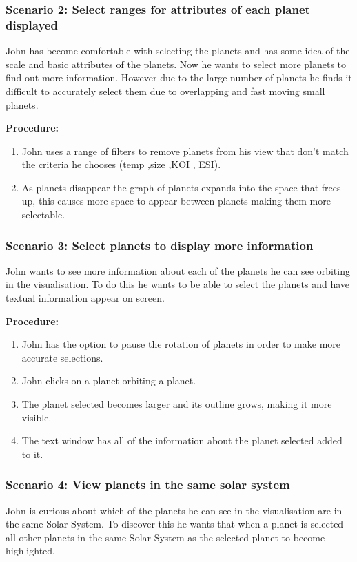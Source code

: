   \subsubsection{Scenario 2: Select ranges for attributes of each planet displayed}
 John has become comfortable with selecting the planets and has some idea of the
scale and basic attributes of the planets. Now he wants to select more planets
to find out more information. However due to the large number of planets he
finds it difficult to accurately select them due to overlapping and fast moving
small planets.
 
  {\bf Procedure:}
  \begin{enumerate}
 \item John uses a range of filters to remove planets from his view that don't
match the criteria he chooses (temp ,size ,KOI , ESI).
\item As planets disappear the graph of planets expands into the space that
frees up, this causes more space to appear between planets making them more
selectable.
 \end{enumerate}
 
  \subsubsection{Scenario 3: Select planets to display more information}
 John wants to see more information about each of the planets he can see
orbiting in the visualisation. To do this he wants to be able to select the
planets and have textual information appear on screen.
 
  {\bf  Procedure:}
   \begin{enumerate}
 \item John has the option to pause the rotation of planets in order to make
more accurate selections. 
 \item John clicks on a planet orbiting a planet.
\item The planet selected becomes larger and its outline grows, making it more
visible.
\item The text window has all of the information about the planet selected added
to it.
 \end{enumerate}
 
 \subsubsection{Scenario 4: View planets in the same solar system}
John is curious about which of the planets he can see in the
visualisation are in the same Solar System. To discover this he wants that when
a planet is selected all other planets in the same Solar System as the selected
planet to become highlighted.
 
